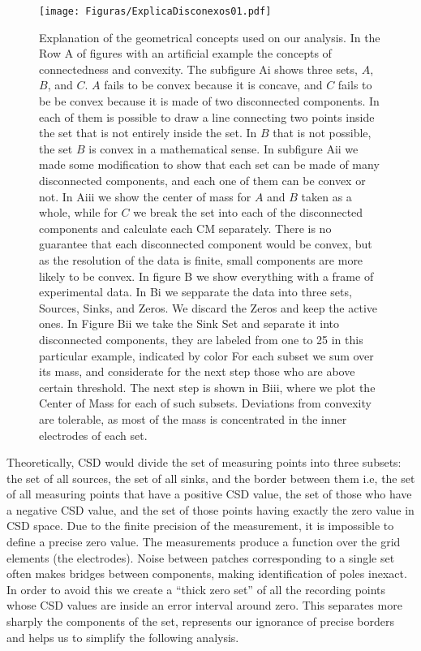 \documentclass[12pt, letterpaper]{article}
\begin{document}
\begin{figure}
  \texttt{[image: Figuras/ExplicaDisconexos01.pdf]}
  \caption{ Explanation of the geometrical concepts used on our analysis.
    In the Row A of figures
    with an artificial example the concepts of connectedness and convexity.
    The subfigure Ai shows
    three sets, $A$, $B$, and $C$. $A$ fails to be convex because it is concave,
    and $C$ fails to be
    be convex because it is made of two disconnected components.
    In each of them is possible to draw a line
    connecting two points inside the set that is not entirely inside the set.
    In $B$ that is not possible, the set $B$ is convex in a mathematical sense.
    In subfigure Aii we made some modification to show that
    each set can be made of many disconnected components,
    and each one of them can be convex or not.  In Aiii we show the center of
    mass for $A$ and $B$
    taken as a whole, while for $C$ we break the set into each of the disconnected
    components and calculate each CM separately. There is no guarantee that each
    disconnected component would be convex, but as the resolution of the data is finite,
    small components are more likely to
    be convex. In figure B we show everything with a frame of experimental data.
    In Bi we sepparate the
    data into three sets, Sources, Sinks, and Zeros.
    We discard the Zeros and keep the active ones.
    In Figure Bii we take the Sink Set and separate it into disconnected components,
    they are labeled from one to 25 in this particular example,
    indicated by color
    For each subset we sum over its mass, and 
    considerate for the next step those who are above certain threshold. The
    next step is shown in Biii, where we plot the Center of Mass for each of
    such subsets. Deviations
    from convexity are tolerable,
    as most of the mass is concentrated in the inner electrodes
    of each set.
  }
  \label{disconnectedsets}
\end{figure}



Theoretically, CSD would divide the set of measuring points into three subsets: the set of all sources, the set of all sinks, and the border between them i.e, the set of all measuring points that have a positive CSD  value, the set of those who have a negative CSD value, and the set of those points having exactly the zero value in CSD space.
Due to the finite precision of the measurement,
it is impossible to define a precise zero value.
The measurements produce a function over the grid elements (the electrodes).
Noise between patches corresponding to a single set often makes bridges
between components, making identification of poles inexact.
In order to avoid this we create a ``thick zero set'' of all the recording
points whose CSD values are inside an error interval around zero.
This separates more sharply the components of the set,
represents our ignorance of precise borders and helps
us to simplify the following analysis.
\end{document}
